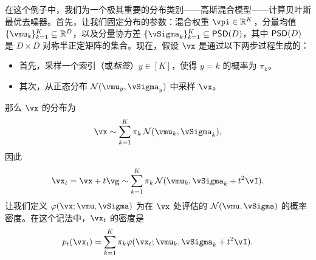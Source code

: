 \documentclass[../../book-main.tex]{subfiles}
\begin{document}
\begin{example}[从高斯混合模型中去噪高斯噪声]\label{example:denoising_gaussian_mixture}
	在这个例子中，我们为一个极其重要的分布类别——高斯混合模型——计算贝叶斯最优去噪器。首先，让我们固定分布的参数：混合权重 \(\vpi \in \R^{K}\)，分量均值 \(\{\vmu_{k}\}_{k = 1}^{K} \subseteq \R^{D}\)，以及分量协方差 \(\{\vSigma_{k}\}_{k = 1}^{K} \subseteq \PSD(D)\)，其中 \(\mathsf{PSD}(D)\) 是 \(D \times D\) 对称半正定矩阵的集合。现在，假设 \(\vx\) 是通过以下两步过程生成的：
	\begin{itemize}
		\item 首先，采样一个索引（或\textit{标签}）\(y \in [K]\)，使得 \(y = k\) 的概率为 \(\pi_{k}\)。
		\item 其次，从正态分布 \(\dNorm(\vmu_{y}, \vSigma_{y})\) 中采样 \(\vx\)。
	\end{itemize}
	那么 \(\vx\) 的分布为
	\begin{equation}
		\vx \sim \sum_{k = 1}^{K}\pi_{k}\dNorm(\vmu_{k}, \vSigma_{k}),
	\end{equation}
	因此
	\begin{equation}
		\vx_{t} = \vx + t\vg \sim \sum_{k = 1}^{K}\pi_{k}\dNorm(\vmu_{k}, \vSigma_{k} + t^{2}\vI).
	\end{equation}
	让我们定义 \(\phi(\vx ; \vmu, \vSigma)\) 为在 \(\vx\) 处评估的 \(\dNorm(\vmu, \vSigma)\) 的概率密度。在这个记法中，\(\vx_{t}\) 的密度是
	\begin{equation}
		p_{t}(\vx_{t}) = \sum_{k = 1}^{K}\pi_{k}\phi(\vx_{t} ; \vmu_{k}, \vSigma_{k} + t^{2}\vI).
	\end{equation}


\end{example}
\end{document}
